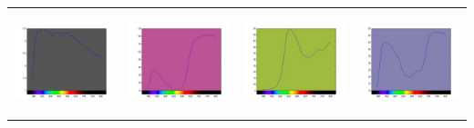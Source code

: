 \begin{tabular}{  c c c c }
\includegraphics[width=3.0cm,height=3.0cm]{ColorPaper/ch5.jpg}
&
\includegraphics[width=3.0cm,height=3.0cm]{ColorPaper/ch6.jpg}
&
\includegraphics[width=3.0cm,height=3.0cm]{ColorPaper/ch7.jpg}
&
\includegraphics[width=3.0cm,height=3.0cm]{ColorPaper/ch8.jpg}
\\


\end{tabular}
